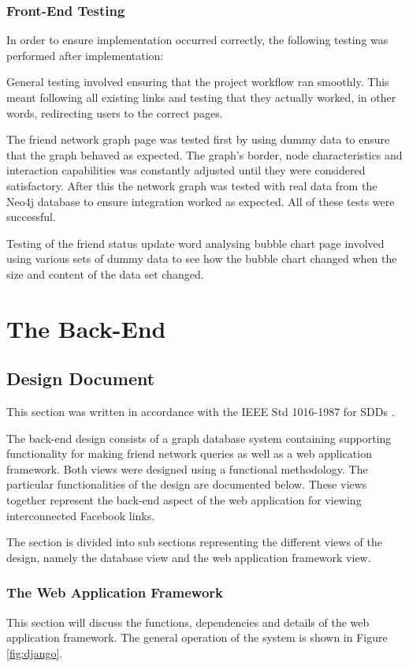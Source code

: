 \documentclass[12pt,onecolumn]{article}
\begin{document}
   \subsubsection{Front-End Testing}
   In order to ensure implementation occurred correctly, the following testing was performed after implementation: 
   
   General testing involved ensuring that the project workflow ran smoothly. This meant following all existing links and testing that they actually worked, in other words, redirecting users to the correct pages.
   
   The friend network graph page was tested first by using dummy data to ensure that the graph behaved as expected. The graph's border, node characteristics and interaction capabilities was constantly adjusted until they were considered satisfactory. After this the network graph was tested with real data from the Neo4j database to ensure integration worked as expected. All of these tests were successful.
   
   Testing of the friend status update word analysing bubble chart page involved using various sets of dummy data to see how the bubble chart changed when the size and content of the data set changed.
	
	\section{The Back-End}
	
	\subsection{Design Document} %
	This section was written in accordance with the IEEE Std 1016-1987 for SDDs \cite{IEEE}. 
	
	The back-end design consists of a graph database system containing supporting functionality for making friend network queries as well as a web application framework. Both views were designed using a functional methodology. The particular functionalities of the design are documented below. These views together represent the back-end aspect of the web application for viewing interconnected Facebook links.
	
	The section is divided into sub sections representing the different views of the design, namely the database view and the web application framework view.
	
	\subsubsection{The Web Application Framework}
	This section will discuss the functions, dependencies and details of the web application framework. The general operation of the system is shown in Figure \ref{fig:django}.
	
\end{document}
